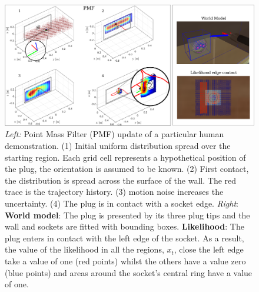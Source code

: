 
\begin{figure}
 \centering
   \includegraphics[width=\textwidth]{./ch4-PiH/Figures/PMF/pmf_likelihood.pdf}
   \caption{\textit{Left:} Point Mass Filter (PMF) update of a particular human demonstration. (1) Initial uniform distribution spread over the starting 
   region. Each grid cell represents a hypothetical position of the plug, the orientation is assumed to be known. (2) First contact, the distribution 
   is spread across the surface of the wall. The red trace is the trajectory history. (3) motion noise increases the uncertainty. (4) The plug is in contact with a socket edge.
   \textit{Right}: \textbf{World model}: The plug is presented by its three plug tips and the wall and sockets are fitted with bounding boxes.
   \textbf{Likelihood}: The plug enters in contact with the left edge of the socket. As a result, the value of the likelihood in all the regions, $x_t$, close the left edge take 
   a value of one (red points)  whilst the others have a value zero (blue points) and areas around the socket's central 
   ring have a value of one. }
  \label{fig:PMF}
\end{figure}

